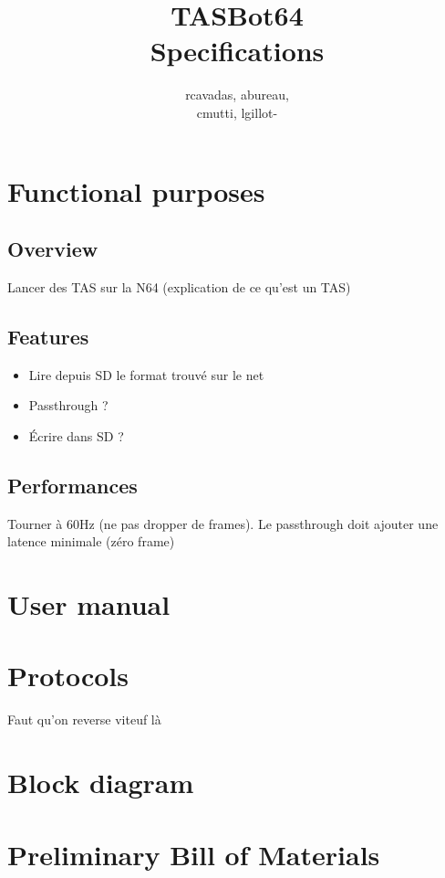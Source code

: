 \documentclass[a4paper,oneside,12pt]{article}
\title{TASBot64\\Specifications}
\author{rcavadas, abureau,\\cmutti, lgillot-}
\begin{document}
\maketitle

\section{Functional purposes}
\subsection{Overview}
Lancer des TAS sur la N64 (explication de ce qu'est un TAS)

\subsection{Features}
\begin{itemize}
\item Lire depuis SD le format trouvé sur le net
\item Passthrough ?
\item Écrire dans SD ?
\end{itemize}

\subsection{Performances}
Tourner à 60Hz (ne pas dropper de frames). Le passthrough doit ajouter une latence minimale (zéro frame)

\section{User manual}

\section{Protocols}
Faut qu'on reverse viteuf là

\section{Block diagram}

\section{Preliminary Bill of Materials}
\end{document}
